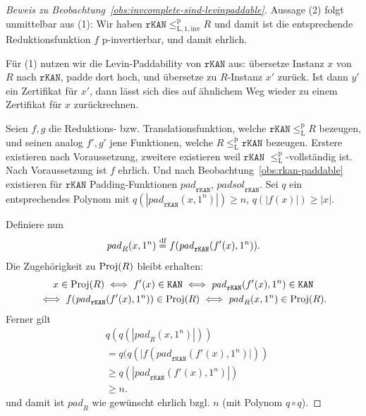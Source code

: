 \medskip
\begin{proof}[Beweis zu Beobachtung~\ref{obs:invcomplete-sind-levinpaddable}]
    Aussage (2) folgt unmittelbar aus (1): Wir haben $\mathtt{rKAN}\leq_\mathrm{L,1,inv}^\mathrm{p} R$ und damit ist die entsprechende Reduktionsfunktion $f$ p-invertierbar, und damit ehrlich.

    Für (1) nutzen wir die Levin-Paddability von $\mathtt{rKAN}$ aus: übersetze Instanz $x$ von $R$ nach $\mathtt{rKAN}$, padde dort hoch, und übersetze zu $R$-Instanz $x'$ zurück. Ist dann $y'$ ein Zertifikat für $x'$, dann lässt sich dies auf ähnlichem Weg wieder zu einem Zertifikat für $x$ zurückrechnen.

    Seien $f, g$ die Reduktions- bzw. Translationsfunktion, welche $\mathtt{rKAN}\leq_\mathrm{L}^\mathrm p R$ bezeugen, und seinen analog $f', g'$ jene Funktionen, welche $R\leq_\mathrm{L}^\mathrm p \mathtt{rKAN}$ bezeugen. Erstere existieren nach Voraussetzung, zweitere existieren weil $\mathtt{rKAN}$ $\leq_\mathrm{L}^\mathrm p$-vollständig ist.
    Nach Voraussetzung ist $f$ ehrlich. %
    Und nach Beobachtung~\ref{obs:rkan-paddable} existieren für $\mathtt{rKAN}$ Padding-Funktionen $\mathit{pad}_\mathtt{rKAN}$, $\mathit{padsol}_\mathtt{rKAN}$.
    Sei $q$ ein entsprechendes Polynom mit $q(|\mathit{pad}_\mathtt{rKAN}(x, 1^n)|)\geq n$, $q(|f(x)|) \geq |x|$.

    Definiere nun
    \[ \mathit{pad}_R(x, 1^n) \stackrel{\text{df}}{=}  f(\mathit{pad}_\mathtt{rKAN}(f'(x), 1^n)). \]
    Die Zugehörigkeit zu $\operatorname{Proj}(R)$ bleibt erhalten:
    \begin{gather*}
        x\in \operatorname{Proj}(R) \iff f'(x) \in \mathtt{KAN} \iff \mathit{pad}_\mathtt{rKAN}(f'(x), 1^n) \in \mathtt{KAN}\\ \iff f(\mathit{pad}_\mathtt{rKAN}(f'(x), 1^n)) \in \operatorname{Proj}(R) \iff \mathit{pad}_R(x, 1^n) \in\operatorname{Proj}(R).
    \end{gather*}
    Ferner gilt
    \begin{align*} &q(q(|\mathit{pad}_R(x, 1^n)|)) \\&= q(q(|f(\mathit{pad}_\mathtt{rKAN}(f'(x), 1^n)|))\\&\geq q(|\mathit{pad}_\mathtt{rKAN}(f'(x), 1^n)|)\\ &\geq n.
    \end{align*}
    und damit ist $\mathit{pad}_R$ wie gewünscht ehrlich bzgl. $n$ (mit Polynom $q\circ q$).


\end{proof}
